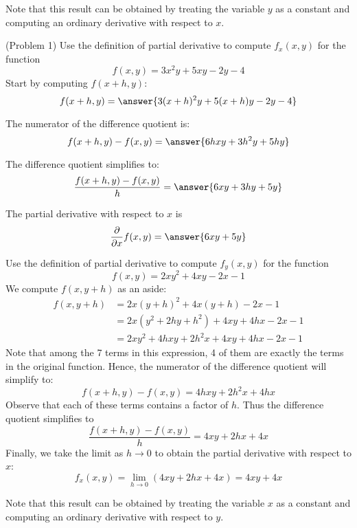 \documentclass[handout]{ximera}
\begin{document}
\begin{remark}
Note that this result can be obtained by treating the variable $y$ as a constant and computing an ordinary derivative with respect to $x$.
\end{remark}

\begin{problem}(Problem 1)
Use the definition of partial derivative to compute $f_x(x,y)$ for the function
\[
f(x,y) = 3x^2y + 5xy - 2y - 4
\]
Start by computing $f(x+h, y)$:
\[
f(x+h, y) = \answer{3(x+h)^2y + 5(x+h)y - 2y - 4}
\]

The numerator of the difference quotient is:
\[
f(x+h,y) - f(x,y) = \answer{6hxy + 3h^2y + 5hy}
\]

The difference quotient simplifies to:
\[
\frac{f(x+h,y) - f(x,y)}{h} = \answer{6xy + 3hy + 5y}
\]


The partial derivative with respect to $x$ is
\[
\frac{\partial}{\partial x} f(x,y) = \answer{6xy + 5y}
\]

\end{problem}

\begin{example}[Example 2]
Use the definition of partial derivative to compute $f_y(x,y)$ for the function
\[
f(x,y) = 2xy^2 + 4xy - 2x -1
\]
We compute $f(x, y+h)$ as an aside:
\begin{align*}
f(x, y+h) &= 2x(y+h)^2 + 4x(y+h) - 2x  -1\\
          &= 2x(y^2 + 2hy + h^2) + 4xy + 4hx - 2x - 1\\
          &= 2xy^2 + 4hxy + 2h^2x + 4xy + 4hx - 2x - 1
\end{align*}
Note that among the 7 terms in this expression, 4 of them are exactly the terms in the original function.
Hence, the numerator of the difference quotient will simplify to:
\[
f(x+h, y) - f(x,y) =  4hxy + 2h^2x  + 4hx
\]
Observe that each of these terms contains a factor of $h$. Thus the difference quotient simplifies to
\[
\frac{f(x+h, y) -f(x, y)}{h} = 4xy + 2hx +4x
\]
Finally, we take the limit as $h \to 0$ to obtain the partial derivative with respect to $x$:
\[
f_x(x,y) = \lim_{h \to 0} \left(4xy + 2hx +4x\right) = 4xy + 4x
\]

\end{example}

\begin{remark}
Note that this result can be obtained by treating the variable $x$ as a constant and computing an ordinary derivative with respect to $y$.
\end{remark}
\end{document}
